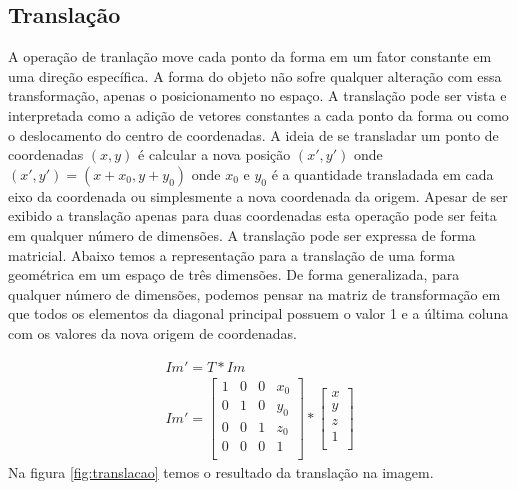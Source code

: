 \documentclass[
	article,			%
	11pt,				%
	oneside,			%
	a4paper,			%
	english,			%
	brazil,				%
	sumario=tradicional
	]{abntex2}
\begin{document}
\subsection{Translação}
A operação de tranlação move cada ponto da forma em um fator constante em uma
direção específica. A forma do objeto não sofre qualquer alteração com essa
transformação, apenas o posicionamento no espaço. A translação pode ser vista e
interpretada como a adição de vetores constantes a cada ponto da forma ou como o
deslocamento do centro de coordenadas.
A ideia de se transladar um ponto de coordenadas $(x,y)$ é calcular a nova
posição $(x',y')$ onde $(x',y')=(x+x_0,y+y_0)$ onde $x_0$ e $y_0$ é a
quantidade transladada em cada eixo da coordenada ou simplesmente a nova coordenada da
origem.
Apesar de ser exibido a translação apenas para duas coordenadas esta operação
pode ser feita em qualquer número de dimensões.
A translação pode ser expressa de forma matricial. Abaixo temos a representação
para a translação de uma forma geométrica em um espaço de três dimensões. De
forma generalizada, para qualquer número de dimensões, podemos pensar na matriz
de transformação em que todos os elementos da diagonal principal possuem o
valor 1 e a última coluna com os valores da nova origem de coordenadas.

\begin{align}
Im'=T*Im\\
Im'=\begin{bmatrix}
1 & 0 & 0 & x_0\\
0 & 1 & 0 & y_0\\
0 & 0 & 1 & z_0\\
0 & 0 & 0 & 1\\
\end{bmatrix}*
\begin{bmatrix}
x\\
y\\
z\\
1\\
\end{bmatrix}
\end{align}
Na figura \ref{fig:translacao} temos o resultado da translação na imagem.
\end{document}

